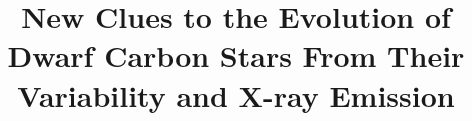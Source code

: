 \documentclass[twocolumn, tighten, times, astrosymb]{aastex631}
\begin{document}
\title{New Clues to the Evolution of Dwarf Carbon Stars From Their Variability and X-ray Emission}


\end{document}
